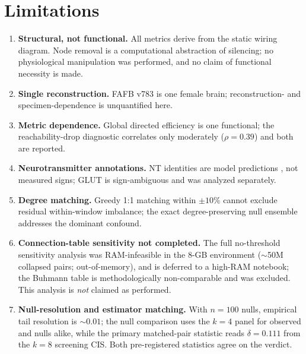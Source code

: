 \section{Limitations}

\begin{enumerate}
\item \textbf{Structural, not functional.} All metrics derive from the
static wiring diagram. Node removal is a computational abstraction of
silencing; no physiological manipulation was performed, and no claim of
functional necessity is made.
\item \textbf{Single reconstruction.} FAFB v783 is one female brain;
reconstruction- and specimen-dependence is unquantified here.
\item \textbf{Metric dependence.} Global directed efficiency is one
functional; the reachability-drop diagnostic correlates only moderately
($\rho=0.39$) and both are reported.
\item \textbf{Neurotransmitter annotations.} NT identities are
model predictions \cite{schlegel2024}, not measured signs; GLUT is
sign-ambiguous and was analyzed separately.
\item \textbf{Degree matching.} Greedy 1:1 matching within $\pm10\%$
cannot exclude residual within-window imbalance; the exact
degree-preserving null ensemble addresses the dominant confound.
\item \textbf{Connection-table sensitivity not completed.} The full
no-threshold sensitivity analysis was RAM-infeasible in the 8-GB
environment ($\sim$50M collapsed pairs; out-of-memory), and is deferred
to a high-RAM notebook; the Buhmann table is methodologically
non-comparable and was excluded. This analysis is \emph{not} claimed as
performed.
\item \textbf{Null-resolution and estimator matching.} With $n=100$
nulls, empirical tail resolution is ${\sim}0.01$; the null comparison
uses the $k{=}4$ panel for observed and nulls alike, while the primary
matched-pair statistic reads $\delta=0.111$ from the $k{=}8$ screening
CIS. Both pre-registered statistics agree on the verdict.
\end{enumerate}
